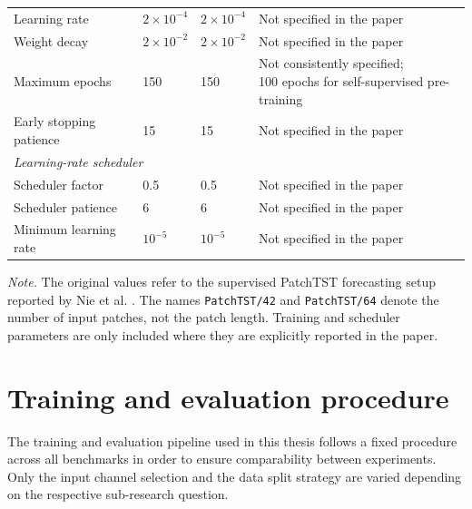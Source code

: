 \begin{table}[htbp]
\begin{tabular}{llll}
        Learning rate & $2 \times 10^{-4}$ & $2 \times 10^{-4}$ & Not specified in the paper \\
        Weight decay & $2 \times 10^{-2}$ & $2 \times 10^{-2}$ & Not specified in the paper \\
        Maximum epochs & 150 & 150 & \makecell[l]{Not consistently specified;\\100 epochs for self-supervised pre-training} \\
        Early stopping patience & 15 & 15 & Not specified in the paper \\
        \midrule
        \multicolumn{4}{l}{\textit{Learning-rate scheduler}} \\
        Scheduler factor & 0.5 & 0.5 & Not specified in the paper \\
        Scheduler patience & 6 & 6 & Not specified in the paper \\
        Minimum learning rate & $10^{-5}$ & $10^{-5}$ & Not specified in the paper \\
        \bottomrule
    \end{tabular}

    \vspace{0.2cm}
    \begin{minipage}{0.95\linewidth}
        \footnotesize
        \textit{Note.} The original values refer to the supervised PatchTST forecasting setup reported by Nie et al. \cite{nieTimeSeriesWorth2023b}. The names \texttt{PatchTST/42} and \texttt{PatchTST/64} denote the number of input patches, not the patch length. Training and scheduler parameters are only included where they are explicitly reported in the paper.
    \end{minipage}
\end{table}





\newpage








\section{Training and evaluation procedure}\label{sec:train_eval}
The training and evaluation pipeline used in this thesis follows a fixed procedure across all benchmarks in order to ensure comparability between experiments. Only the input channel selection and the data split strategy are varied depending on the respective sub-research question.


